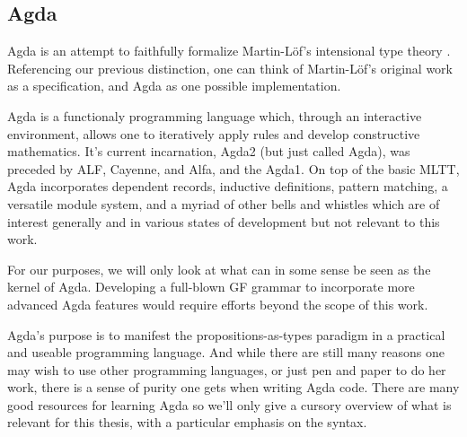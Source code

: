 \subsection{Agda}

Agda is an attempt to faithfully formalize Martin-Löf's intensional type theory
\cite{ml1984}. Referencing our previous distinction, one can think of
Martin-Löf's original work as a specification, and Agda as one possible
implementation.

Agda is a functionaly programming language which, through an interactive
environment, allows one to iteratively apply rules and develop constructive
mathematics. It's current incarnation, Agda2 (but just called Agda), was
preceded by ALF, Cayenne, and Alfa, and the Agda1. On top of the basic MLTT,
Agda incorporates dependent records, inductive definitions, pattern matching, a
versatile module system, and a myriad of other bells and whistles which are of
interest generally and in various states of development but not relevant to this
work.

For our purposes, we will only look at what can in some sense be seen as the
kernel of Agda. Developing a full-blown GF grammar to incorporate more
advanced Agda features would require efforts beyond the scope of this work.

Agda's purpose is to manifest the propositions-as-types paradigm in a practical
and useable programming language. And while there are still many reasons one may
wish to use other programming languages, or just pen and paper to do her work,
there is a sense of purity one gets when writing Agda code. There are many good
resources for learning Agda \cite{Bove2009} \cite{stump} \cite{ulf}
\cite{wadler} so we'll only give a cursory overview of what is relevant for this
thesis, with a particular emphasis on the syntax.





